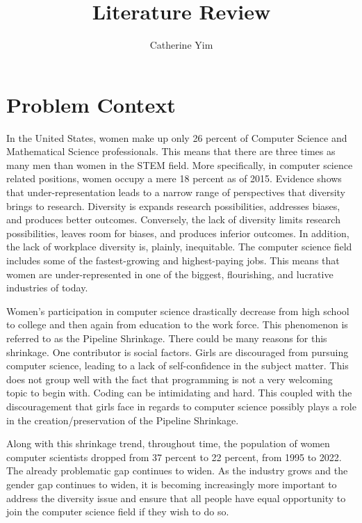 \documentclass[10pt,twocolumn]{article}
\title{Literature Review}
\author{Catherine Yim}
\affiliation{Occidental College}
\begin{document}
\maketitle

\section{Problem Context}
In the United States, women make up only 26 percent of Computer Science and Mathematical Science professionals. \cite{wang2015gender} This means that there are three times as many men than women in the STEM field. More specifically, in computer science related positions, women occupy a mere 18 percent as of 2015. Evidence shows that under-representation leads to a narrow range of perspectives that diversity brings to research. Diversity is expands research possibilities, addresses biases, and produces better outcomes. \cite{ostrom2008difference} Conversely, the lack of diversity limits research possibilities, leaves room for biases, and produces inferior outcomes. In addition, the lack of workplace diversity is, plainly, inequitable. \cite{wang2015gender} The computer science field includes some of the fastest-growing and highest-paying jobs. This means that women are under-represented in one of the biggest, flourishing, and lucrative industries of today. \cite{ostrom2008difference}

Women's participation in computer science drastically decrease from high school to college and then again from education to the work force. \cite{bayliss2006games} This phenomenon is referred to as the Pipeline Shrinkage. There could be many reasons for this shrinkage. One contributor is social factors. Girls are discouraged from pursuing computer science, leading to a lack of self-confidence in the subject matter. This does not group well with the fact that programming is not a very welcoming topic to begin with. Coding can be intimidating and hard. This coupled with the discouragement that girls face in regards to computer science possibly plays a role in the creation/preservation of the Pipeline Shrinkage. 

Along with this shrinkage trend, throughout time, the population of women computer scientists dropped from 37 percent to 22 percent, from 1995 to 2022. \cite{girlswhocode2021} The already problematic gap continues to widen. As the industry grows and the gender gap continues to widen, it is becoming increasingly more important to address the diversity issue and ensure that all people have equal opportunity to join the computer science field if they wish to do so.
\end{document}
